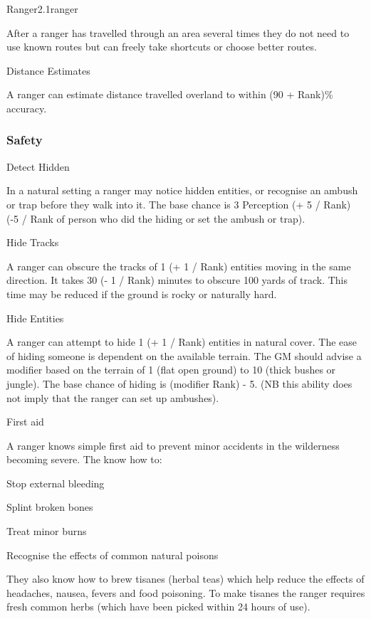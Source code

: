 \begin{skill}{Ranger}{2.1}{ranger}
\begin{Description}
After a ranger has travelled through an area several times they do not
need to use known routes but can freely take shortcuts or choose
better routes.

\item[Distance Estimates]

A ranger can estimate distance travelled overland to within (90 +
Rank)\% accuracy.
\end{Description}

\subsubsection{Safety}

\begin{Description}

\item[Detect Hidden]

In a natural setting a ranger may notice hidden entities, or recognise
an ambush or trap before they walk into it. The base chance is 3 \x
Perception (+ 5 / Rank) (-5 / Rank of person who did the hiding or set
the ambush or trap).

\item[Hide Tracks]

A ranger can obscure the tracks of 1 (+ 1 / Rank) entities moving in
the same direction.  It takes 30 (- 1 / Rank) minutes to obscure 100
yards of track.  This time may be reduced if the ground is rocky or
naturally hard.

\item[Hide Entities]

A ranger can attempt to hide 1 (+ 1 / Rank) entities in natural cover.
The ease of hiding someone is dependent on the available terrain. The
GM should advise a modifier based on the terrain of 1 (\eg flat open
ground) to 10 (\eg thick bushes or jungle). The base chance of hiding
is (modifier \x Rank) - 5.  (NB this ability does not imply that the
ranger can set up ambushes).

\item[First aid]

A ranger knows simple first aid to prevent minor accidents in the wilderness becoming severe.  The know how to:
\begin{Itemize}
\item Stop external bleeding
\item Splint broken bones
\item Treat minor burns
\item Recognise the effects of common natural poisons
\end{Itemize}
They also know how to brew tisanes (herbal teas) which help reduce the
effects of headaches, nausea, fevers and food poisoning.  To make
tisanes the ranger requires fresh common herbs (which have been picked
within 24 hours of use).


\end{Description}
\end{skill}
